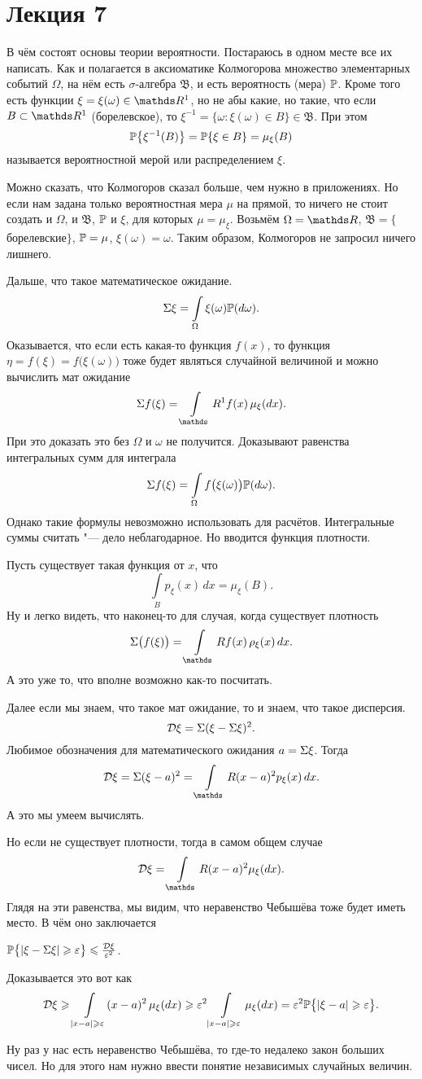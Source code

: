 \section{Лекция 7}
В чём состоят основы теории вероятности. Постараюсь в одном месте все их написать. Как и полагается в аксиоматике Колмогорова множество элементарных событий $\Omega$, на нём есть $\sigma$-алгебра $\mathfrak B$, и есть вероятность (мера) $\P$. Кроме того есть функции $\xi =\xi(\omega)\in\R^1$, но не абы какие, но такие, что если $B\subset \R^1$ (борелевское), то $\xi^{-1} = \big\{ \omega\colon \xi(\omega) \in B\big\}\in\mathfrak B$. При этом
\[
  \P\big\{\xi^{-1}(B)\big\} = \P\{\xi\in B\} = \mu_\xi(B)
\]
называется вероятностной мерой или распределением $\xi$.

Можно сказать, что Колмогоров сказал больше, чем нужно в приложениях. Но если нам задана только вероятностная мера $\mu$ на прямой, то ничего не стоит создать и $\Omega$, и $\mathfrak B$, $\P$ и $\xi$, для которых $\mu = \mu_\xi$. Возьмём $\Omega = \R$, $\mathfrak B = \{$борелевские$\}$, $\P = \mu$, $\xi(\omega) = \omega$. Таким образом, Колмогоров не запросил ничего лишнего.

Дальше, что такое математическое ожидание.
\[
  \E\xi = \int\limits_\Omega \xi(\omega)\P(d\omega).
\]
Оказывается, что если есть какая-то функция $f(x)$, то функция $\eta = f(\xi) = f\big(\xi(\omega)\big)$ тоже будет являться случайной величиной и можно вычислить мат ожидание
\[
  \E f(\xi) = \int\limits_\R^1 f(x)\,\mu_\xi(dx).
\]
При это доказать это без $\Omega$ и $\omega$ не получится. Доказывают равенства интегральных сумм для интеграла
\[
  \E f(\xi) = \int\limits_\Omega f\big(\xi(\omega)\big)\P(d\omega).
\]
Однако такие формулы невозможно использовать для расчётов. Интегральные суммы считать "--- дело неблагодарное. Но вводится функция плотности.

Пусть существует такая функция от $x$, что
\[
  \int\limits_B p_\xi(x)\,dx = \mu_\xi(B).
\]
Ну и легко видеть, что наконец-то для случая, когда существует плотность
\[
  \E\big(f(\xi)\big) = \int\limits_\R f(x)\,\rho_\xi(x)\,dx.
\]
А это уже то, что вполне возможно как-то посчитать.

Далее если мы знаем, что такое мат ожидание, то и знаем, что такое дисперсия.
\[
  \D\xi = \E (\xi - \E\xi)^2.
\]
Любимое обозначения для математического ожидания $a= \E\xi$. Тогда
\[
  \D\xi = \E (\xi-a)^2 = \int\limits_\R (x-a)^2p_\xi(x)\,dx.
\]
А это мы умеем вычислять.

Но если не существует плотности, тогда в самом общем случае
\[
  \D\xi = \int\limits_\R (x-a)^2\mu_\xi(dx).
\]
Глядя на эти равенства, мы видим, что неравенство Чебышёва тоже будет иметь место. В чём оно заключается
\begin{Ut}
  $\P\big\{|\xi - \E\xi| \ge \e\big\} \le \frac{\D\xi}{\e^2}$.
\end{Ut}
\begin{Proof}
Доказывается это вот как
\[
  \D\xi\ge \int\limits_{|x-a|\ge \e} (x-a)^2\,\mu_\xi(dx) \ge \e^2\int\limits_{|x-a|\ge \e} \mu_\xi(dx) = \e^2\P\big\{|\xi-a|\ge \e\big\}.
\]
\end{Proof}
Ну раз у нас есть неравенство Чебышёва, то где-то недалеко закон больших чисел. Но для этого нам нужно ввести понятие независимых случайных величин.

